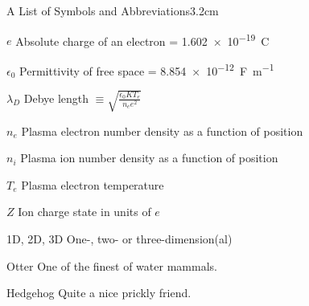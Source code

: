 \begin{mclistof}{A List of Symbols and Abbreviations}{3.2cm}

\item[$e$] Absolute charge of an electron = \qty{1.602e-19}{C}
\item[$\epsilon_0$] Permittivity of free space = \qty{8.854e-12}{F.m^{-1}}
\item[$\lambda_D$]Debye length $\equiv \sqrt{\frac{\epsilon_0KT_e}{n_ee^2}}$
\item[$n_e$] Plasma electron number density as a function of position
\item[$n_i$] Plasma ion number density as a function of position
\item[$T_e$] Plasma electron temperature
\item[$Z$] Ion charge state in units of $e$

\item[1D, 2D, 3D] One-, two- or three-dimension(al)

\item[Otter] One of the finest of water mammals.

\item[Hedgehog] Quite a nice prickly friend.

\begin{acronym}
\end{acronym}

\end{mclistof} 
